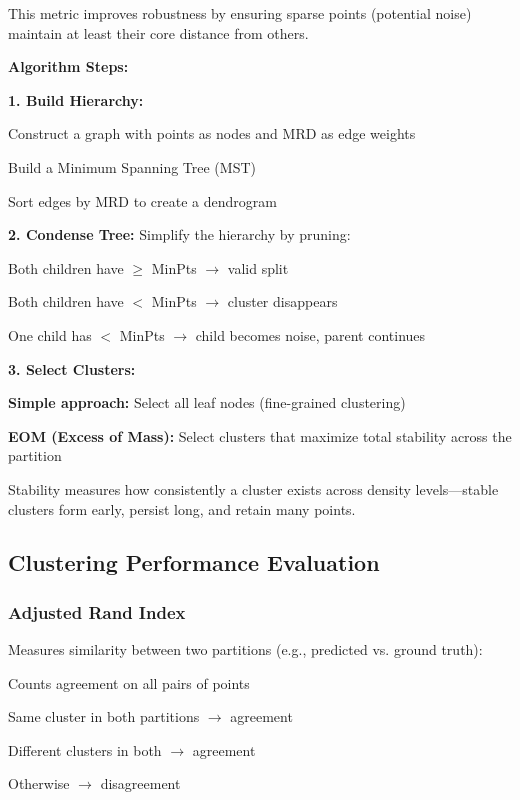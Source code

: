     This metric improves robustness by ensuring sparse points (potential noise) maintain at least their core distance from others.
    
    \textbf{Algorithm Steps:}
    
    \textbf{1. Build Hierarchy:}
    \begin{compactitemize}
        \item Construct a graph with points as nodes and MRD as edge weights
        \item Build a Minimum Spanning Tree (MST)
        \item Sort edges by MRD to create a dendrogram
    \end{compactitemize}
    
    \textbf{2. Condense Tree:} Simplify the hierarchy by pruning:
    \begin{compactitemize}
        \item Both children have $\geq$ MinPts $\rightarrow$ valid split
        \item Both children have $<$ MinPts $\rightarrow$ cluster disappears
        \item One child has $<$ MinPts $\rightarrow$ child becomes noise, parent continues
    \end{compactitemize}
    
    \textbf{3. Select Clusters:}
    \begin{compactitemize}
        \item \textbf{Simple approach:} Select all leaf nodes (fine-grained clustering)
        \item \textbf{EOM (Excess of Mass):} Select clusters that maximize total stability across the partition
    \end{compactitemize}
    
    Stability measures how consistently a cluster exists across density levels—stable clusters form early, persist long, and retain many points.
    
    \subsection{Clustering Performance Evaluation}
    
    \subsubsection{Adjusted Rand Index}
    
    Measures similarity between two partitions (e.g., predicted vs. ground truth):
    \begin{compactitemize}
        \item Counts agreement on all pairs of points
        \item Same cluster in both partitions $\rightarrow$ agreement
        \item Different clusters in both $\rightarrow$ agreement
        \item Otherwise $\rightarrow$ disagreement
    \end{compactitemize}
    
